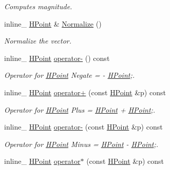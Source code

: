 \begin{DoxyCompactItemize}
\begin{DoxyCompactList}\small\item\em Computes magnitude. \end{DoxyCompactList}\item 
inline\+\_\+ \hyperlink{classHPoint}{H\+Point} \& \hyperlink{classHPoint_ae012e12b2f38ad990c9d7724bb35d513}{Normalize} ()\hypertarget{classHPoint_ae012e12b2f38ad990c9d7724bb35d513}{}\label{classHPoint_ae012e12b2f38ad990c9d7724bb35d513}

\begin{DoxyCompactList}\small\item\em Normalize the vector. \end{DoxyCompactList}\item 
inline\+\_\+ \hyperlink{classHPoint}{H\+Point} \hyperlink{classHPoint_a0f93fb7382849ac838c572914992e1ed}{operator-\/} () const \hypertarget{classHPoint_a0f93fb7382849ac838c572914992e1ed}{}\label{classHPoint_a0f93fb7382849ac838c572914992e1ed}

\begin{DoxyCompactList}\small\item\em Operator for \hyperlink{classHPoint}{H\+Point} Negate = -\/ \hyperlink{classHPoint}{H\+Point};. \end{DoxyCompactList}\item 
inline\+\_\+ \hyperlink{classHPoint}{H\+Point} \hyperlink{classHPoint_a0b8634cc8070cd006c4df38e3f865b13}{operator+} (const \hyperlink{classHPoint}{H\+Point} \&p) const \hypertarget{classHPoint_a0b8634cc8070cd006c4df38e3f865b13}{}\label{classHPoint_a0b8634cc8070cd006c4df38e3f865b13}

\begin{DoxyCompactList}\small\item\em Operator for \hyperlink{classHPoint}{H\+Point} Plus = \hyperlink{classHPoint}{H\+Point} + \hyperlink{classHPoint}{H\+Point};. \end{DoxyCompactList}\item 
inline\+\_\+ \hyperlink{classHPoint}{H\+Point} \hyperlink{classHPoint_a215c8588bce1b73c2ffe10eaa2e11806}{operator-\/} (const \hyperlink{classHPoint}{H\+Point} \&p) const \hypertarget{classHPoint_a215c8588bce1b73c2ffe10eaa2e11806}{}\label{classHPoint_a215c8588bce1b73c2ffe10eaa2e11806}

\begin{DoxyCompactList}\small\item\em Operator for \hyperlink{classHPoint}{H\+Point} Minus = \hyperlink{classHPoint}{H\+Point} -\/ \hyperlink{classHPoint}{H\+Point};. \end{DoxyCompactList}\item 
inline\+\_\+ \hyperlink{classHPoint}{H\+Point} \hyperlink{classHPoint_a1d954b99cecbb6b9fb70f2eca41aede7}{operator$\ast$} (const \hyperlink{classHPoint}{H\+Point} \&p) const \hypertarget{classHPoint_a1d954b99cecbb6b9fb70f2eca41aede7}{}\label{classHPoint_a1d954b99cecbb6b9fb70f2eca41aede7}


\end{DoxyCompactItemize}
